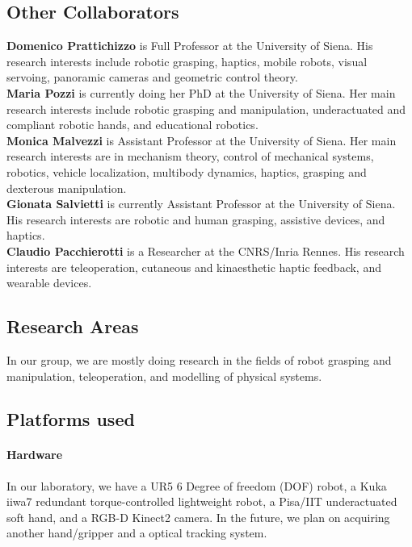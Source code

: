 \documentclass[]{article}
\begin{document}
\subsection{Other Collaborators}
\textbf{Domenico Prattichizzo} is Full Professor at the University of Siena. His research interests include robotic grasping, haptics, mobile robots, visual servoing, panoramic cameras and geometric control theory.\\
\textbf{Maria Pozzi} is currently doing her PhD at the University of Siena. Her main research interests include robotic grasping and manipulation, underactuated and compliant robotic hands, and educational robotics.\\
\textbf{Monica Malvezzi} is Assistant Professor at the University of Siena. Her main research interests are in mechanism theory, control of mechanical systems, robotics, vehicle localization, multibody dynamics, haptics, grasping and dexterous manipulation.\\		
\textbf{Gionata Salvietti} is currently Assistant Professor  at the University of Siena. His research interests are robotic and human grasping, assistive devices, and haptics.\\		
\textbf{Claudio Pacchierotti} is a Researcher at the CNRS/Inria Rennes. His research interests are teleoperation, cutaneous and kinaesthetic haptic feedback, and wearable devices.\\		

\subsection{Research Areas}

In our group, we are mostly doing research in the fields of robot grasping and manipulation, teleoperation, and modelling of physical systems.

\subsection{Platforms used}
\paragraph{Hardware} In our laboratory, we have a UR5 6 Degree of freedom (DOF) robot, a Kuka iiwa7 redundant torque-controlled lightweight robot, a Pisa/IIT underactuated soft hand, and a RGB-D Kinect2 camera.
In the future, we plan on acquiring another hand/gripper and a optical tracking system.
\end{document}
